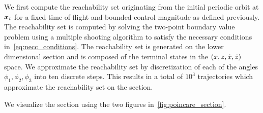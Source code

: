 \documentclass[]{aiaa-tc}%
\begin{document}
We first compute the reachability set originating from the initial periodic orbit at \( \bm{x}_i\) for a fixed time of flight and bounded control magnitude as defined previously.
The reachability set is computed by solving the two-point boundary value problem using a multiple shooting algorithm to satisfy the necessary conditions in~\cref{eq:necc_conditions}.
The reachability set is generated on the lower dimensional \Poincare section and is composed of the terminal states in the \( \left( x,z,\dot{x},\dot{z}  \right) \) space.
We approximate the reachability set by discretization of each of the angles \( \phi_1, \phi_2 , \phi_3 \) into ten discrete steps. 
This results in a total of \(10^3\) trajectories which approximate the reachability set on the \Poincare section.

We visualize the section using the two figures in~\cref{fig:poincare_section}.
\end{document}
